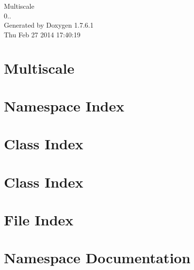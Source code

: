 \documentclass[a4paper]{book}
\begin{document}
\hypersetup{pageanchor=false,citecolor=blue}
\begin{titlepage}
\vspace*{7cm}
\begin{center}
{\Large \-Multiscale \\[1ex]\large 0.. }\\
\vspace*{1cm}
{\large \-Generated by Doxygen 1.7.6.1}\\
\vspace*{0.5cm}
{\small Thu Feb 27 2014 17:40:19}\\
\end{center}
\end{titlepage}
\clearemptydoublepage
{}
\tableofcontents
\clearemptydoublepage
{}
\hypersetup{pageanchor=true,citecolor=blue}
\chapter{\-Multiscale}
\label{index}\hypertarget{index}{}
\chapter{\-Namespace \-Index}

\chapter{\-Class \-Index}

\chapter{\-Class \-Index}

\chapter{\-File \-Index}

\chapter{\-Namespace \-Documentation}







\end{document}

